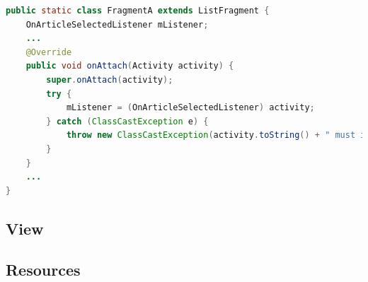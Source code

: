 \begin{lstlisting}[language=JAVA, caption=Example code for enforcing the implementation of a callback interface, label=lst:callback_interface]
public static class FragmentA extends ListFragment {
    OnArticleSelectedListener mListener;
    ...
    @Override
    public void onAttach(Activity activity) {
        super.onAttach(activity);
        try {
            mListener = (OnArticleSelectedListener) activity;
        } catch (ClassCastException e) {
            throw new ClassCastException(activity.toString() + " must implement OnArticleSelectedListener");
        }
    }
    ...
}
\end{lstlisting}

\subsection{View}


\subsection{Resources}


